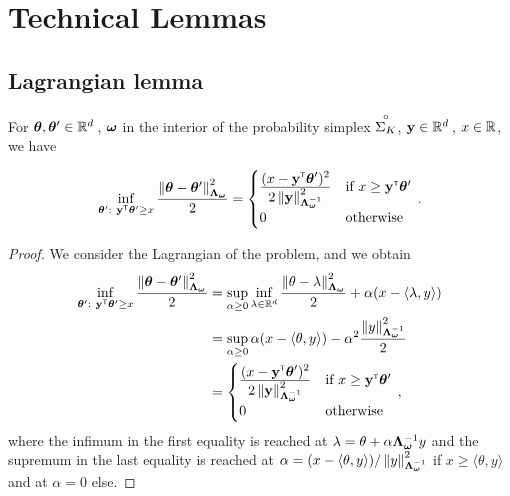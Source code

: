 \section{Technical Lemmas}\label{app:lgc.lemmas}

\subsection{Lagrangian lemma}\label{app:lgc.lemmas.lagrange}

\begin{lemma}\label{lemma:lgc.lagrange_alternative}
For ${\boldsymbol \theta}, {\boldsymbol \theta}' \in \mathbb{R}^d\,$, ${\boldsymbol \omega}$ in the interior of the probability simplex $\overset{\circ}{\Sigma_K}$, ${\bf y}\in\mathbb{R}^d\,$, $x\in\mathbb{R}$, we have

\begin{align*}
    \inf_{{\boldsymbol \theta}':\ {\bf y}^\mathsf{\scriptscriptstyle T}{\boldsymbol \theta}' \geq x} \frac{\left\lVert{\boldsymbol \theta}-{\boldsymbol \theta}'\right\rVert^2_{{\boldsymbol \Lambda}_{{\boldsymbol \omega}}}}{2} = \begin{cases}
    \frac{\displaystyle (x - {\bf y}^\mathsf{\scriptscriptstyle T}{\boldsymbol \theta}')^2}{\displaystyle 2 \left\lVert{\bf y}\right\rVert_{{\boldsymbol \Lambda}_{{\boldsymbol \omega}}^{-1}}^2} &\text{if } x \geq {\bf y}^\mathsf{\scriptscriptstyle T}{\boldsymbol \theta}' \\
0 &\text{otherwise}
\end{cases}\,.
\end{align*}
\end{lemma}

\begin{proof}
We consider the Lagrangian of the problem, and we obtain
\begin{align*}
  \inf_{{\boldsymbol \theta}':\ {\bf y}^\mathsf{\scriptscriptstyle T}{\boldsymbol \theta}' \geq x} \frac{\left\lVert{\boldsymbol \theta}-{\boldsymbol \theta}'\right\rVert^2_{{\boldsymbol \Lambda}_{{\boldsymbol \omega}}}}{2}
  &= \sup_{\alpha \geq 0}\inf_{\lambda \in \mathbb{R}^d} \frac{\displaystyle \left\lVert\theta-\lambda\right\rVert^2_{{\boldsymbol \Lambda}_{{\boldsymbol \omega}}}}{\displaystyle 2}+ \alpha (x-\langle\lambda,y\rangle)\\
  &=  \sup_{\alpha \geq 0} \alpha (x-\langle\theta,y\rangle) - \alpha^2 \frac{\left\lVert y\right\rVert^2_{{\boldsymbol \Lambda}_{{\boldsymbol \omega}}^{-1}}}{2}\\
  &= \begin{cases}
    \frac{\displaystyle (x - {\bf y}^\mathsf{\scriptscriptstyle T}{\boldsymbol \theta}')^2}{\displaystyle 2 \left\lVert{\bf y}\right\rVert_{{\boldsymbol \Lambda}_{{\boldsymbol \omega}}^{-1}}^2} &\text{if } x \geq {\bf y}^\mathsf{\scriptscriptstyle T}{\boldsymbol \theta}' \\
    0 &\text{otherwise}
    \end{cases}\,,
\end{align*}
where the infimum in the first equality is reached at $\lambda = \theta + \alpha {\boldsymbol \Lambda}_{{\boldsymbol \omega}}^{-1} y$ and the supremum in the last equality is reached at $\alpha = (x- \langle\theta,y\rangle)/\left\lVert y\right\rVert_{{\boldsymbol \Lambda}_{{\boldsymbol \omega}}^{-1}}^2$ if $x \geq \langle\theta,y\rangle$ and at $\alpha = 0$ else.
\end{proof}

